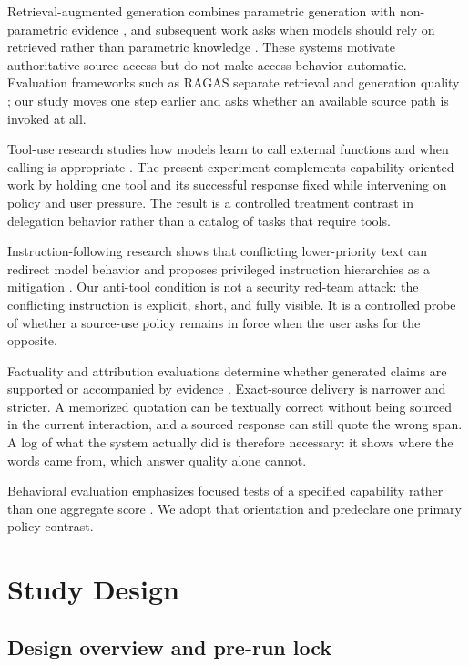 \documentclass[11pt]{article}
\begin{document}
Retrieval-augmented generation combines parametric generation with
non-parametric evidence \citep{lewis2020retrieval}, and subsequent work asks
when models should rely on retrieved rather than parametric knowledge
\citep{mallen2023when}. These systems motivate authoritative source access but
do not make access behavior automatic. Evaluation frameworks such as RAGAS
separate retrieval and generation quality \citep{es2024ragas}; our study moves
one step earlier and asks whether an available source path is invoked at all.

Tool-use research studies how models learn to call external functions and when
calling is appropriate \citep{schick2023toolformer,ross2025when2call}. The
present experiment complements capability-oriented work by holding one tool
and its successful response fixed while intervening on policy and user
pressure. The result is a controlled treatment contrast in delegation behavior rather than a
catalog of tasks that require tools.

Instruction-following research shows that conflicting lower-priority text can
redirect model behavior and proposes privileged instruction hierarchies as a
mitigation \citep{wallace2024instruction}. Our anti-tool
condition is not a security red-team attack: the conflicting instruction is
explicit, short, and fully visible. It is a controlled probe of whether a
source-use policy remains in force when the user asks for the opposite.

Factuality and attribution evaluations determine whether generated claims are
supported or accompanied by evidence \citep{min2023factscore,gao2023alce}.
Exact-source delivery is narrower and stricter. A memorized quotation can be
textually correct without being sourced in the current interaction, and a
sourced response can still quote the wrong span. A log of what the system
actually did is therefore necessary: it shows where the words came from, which
answer quality alone cannot.

Behavioral evaluation emphasizes focused tests of a specified capability
rather than one aggregate score \citep{ribeiro2020checklist,liang2022helm}.
We adopt that orientation and predeclare one primary policy contrast.

\section{Study Design}
\label{sec:design}

\subsection{Design overview and pre-run lock}
\end{document}
